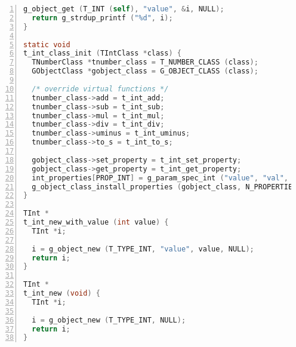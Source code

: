 \begin{lstlisting}[language=C, numbers=left]
  g_object_get (T_INT (self), "value", &i, NULL); 
  return g_strdup_printf ("%d", i);
}

static void
t_int_class_init (TIntClass *class) {
  TNumberClass *tnumber_class = T_NUMBER_CLASS (class);
  GObjectClass *gobject_class = G_OBJECT_CLASS (class);

  /* override virtual functions */
  tnumber_class->add = t_int_add;
  tnumber_class->sub = t_int_sub;
  tnumber_class->mul = t_int_mul;
  tnumber_class->div = t_int_div;
  tnumber_class->uminus = t_int_uminus;
  tnumber_class->to_s = t_int_to_s;

  gobject_class->set_property = t_int_set_property;
  gobject_class->get_property = t_int_get_property;
  int_properties[PROP_INT] = g_param_spec_int ("value", "val", "Integer value", G_MININT, G_MAXINT, 0, G_PARAM_READWRITE);
  g_object_class_install_properties (gobject_class, N_PROPERTIES, int_properties);
}

TInt *
t_int_new_with_value (int value) {
  TInt *i;

  i = g_object_new (T_TYPE_INT, "value", value, NULL);
  return i;
}

TInt *
t_int_new (void) {
  TInt *i;

  i = g_object_new (T_TYPE_INT, NULL);
  return i;
}
\end{lstlisting}

